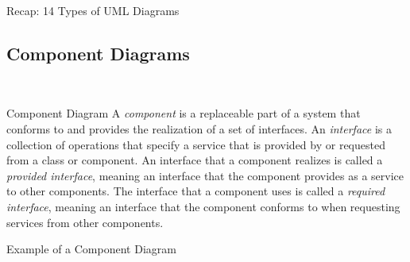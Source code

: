 \begin{frame}{Recap: 14 Types of UML Diagrams\ \mytitlesource{\umlspec}}
\end{frame}

\subsection{Component Diagrams}
\begin{frame}[label=componentslide]{\insertsubsection\ }
	\begin{fancycolumns}[animation=none]
		\begin{definition}{Component Diagram }
			A \emph{component} is a replaceable part of a system that conforms to and provides the realization of a set of interfaces. An \emph{interface} is a collection of operations that specify a service that is provided by or requested from a class or component. An interface that a component realizes is called a \emph{provided interface}, meaning an interface that the component provides as a service to other components. The interface that a component uses is called a \emph{required interface}, meaning an interface that the component conforms to when requesting services from other components. 
		\end{definition}
		\nextcolumn
	\end{fancycolumns}
\end{frame}

\begin{frame}{Example of a Component Diagram}
\end{frame}



